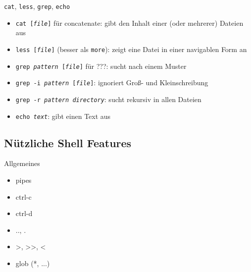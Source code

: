    \begin{frame}{\texttt{cat}, \texttt{less}, \texttt{grep}, \texttt{echo}}
      \begin{itemize}
        \item \texttt{cat [\textit{file}]} für concatenate: gibt den Inhalt einer (oder mehrerer) Dateien aus
        \item \texttt{less [\textit{file}]} (besser als \texttt{more}): zeigt eine Datei in einer navigablen Form an
        \item \texttt{grep \textit{pattern} [\textit{file}]} für ???: sucht nach einem Muster
        \item \texttt{grep -i \textit{pattern} [\textit{file}]}: ignoriert Groß- und Kleinschreibung
        \item \texttt{grep -r \textit{pattern} \textit{directory}}: sucht rekursiv in allen Dateien
        \item \texttt{echo \textit{text}}: gibt einen Text aus
      \end{itemize}
    \end{frame}

  \subsection{Nützliche Shell Features}
    \begin{frame}{Allgemeines}
      \begin{itemize}
        \item pipes\\
        \item ctrl-c\\
        \item ctrl-d\\
        \item .., .\\
        \item >, >>, <\\
        \item glob (*, ...)
      \end{itemize}
    \end{frame}
